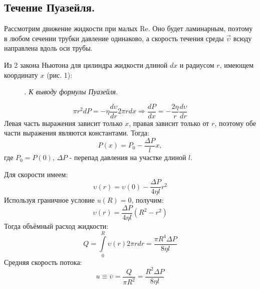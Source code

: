 \documentclass[a4paper]{article}
\begin{document}
\subsection*{Течение Пуазейля.}
Рассмотрим движение жидкости при малых Re. Оно будет ламинарным, поэтому в любом сечении трубки давление одинаково, а скорость течения среды $\vec{\upsilon}$ всюду направлена вдоль оси трубы. 

\noindent
Из 2 закона Ньютона для цилиндра жидкости длиной $dx$ и радиусом $r$, имеющем координату $x$ (рис. 1):

\begin{figure}
\caption{\textit{. К выводу формулы Пуазейля.}}
\end{figure}

\[\pi r^2 dP = -\eta \frac{d\upsilon}{dr} 2\pi r dx \Rightarrow \frac{dP}{dx} = -\frac{2\eta}{r} \frac{d\upsilon}{dr}\]
Левая часть выражения зависит только $x$, правая	 зависит только от  $r$, поэтому обе части выражения являются константами. Тогда:
\begin{equation}
P(x) = P_0 - \frac{\Delta P}{l}x,
 \end{equation} 
где $P_0 = P(0)$, $\Delta P$ - перепад давления на участке длиной $l$. 

\noindent
Для скорости имеем:
\[\upsilon(r) = \upsilon(0) - \frac{\Delta P}{4 \eta l}r^2  \]
Используя граничное условие $u(R) = 0$, получим:
\begin{equation}
\upsilon(r) = \frac{\Delta P}{4\eta l} (R^2 - r^2) 
\end{equation}
Тогда объёмный расход жидкости:
\begin{equation}
Q = \int\limits_{0}^{R} \upsilon(r) 2\pi r dr = \frac{\pi R^4 \Delta P}{8 \eta l}
\end{equation}
Средняя скорость потока:
\begin{equation}\label{eq4}
u \equiv \overline{\upsilon} = \frac{Q}{\pi R^2} = \frac{R^2 \Delta P}{8 \eta l}
\end{equation}
\end{document}
